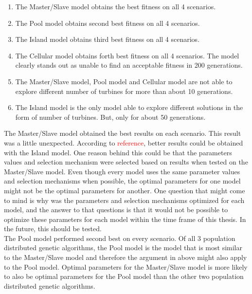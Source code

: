 \begin{enumerate}
    \item The Master/Slave model obtains the best fitness on all 4 scenarios.
    \item The Pool model obtains second best fitness on all 4 scenarios.
    \item The Island model obtains third best fitness on all 4 scenarios. \item The Cellular model obtains forth best fitness on all 4 scenarios. The model clearly stands out as unable to find an acceptable fitness in 200 generations. 
    \item The Master/Slave model, Pool model and Cellular model are not able to explore different number of turbines for more than about 10 generations.
    \item The Island model is the only model able to explore different solutions in the form of number of turbines. But, only for about 50 generations.
\end{enumerate}


\noindent The Master/Slave model obtained the best results on each scenario. This result was a little unexpected. According to \textcolor{red}{reference}, better results could be obtained with the Island model. One reason behind this could be that the parameters values and selection mechanism were selected based on results when tested on the Master/Slave model. Even though every model uses the same parameter values and selection mechanisms when possible, the optimal parameters for one model might not be the optimal parameters for another. One question that might come to mind is why was the parameters and selection mechanisms optimized for each model, and the answer to that questions is that it would not be possible to optimize these parameters for each model within the time frame of this thesis. In the future, this should be tested.\\


\noindent The Pool model performed second best on every scenario. Of all 3 population distributed genetic algorithms, the Pool model is the model that is most similar to the Master/Slave model and therefore the argument in above might also apply to the Pool model. Optimal parameters for the Master/Slave model is more likely to also be optimal parameters for the Pool model than the other two population distributed genetic algorithms. \\


